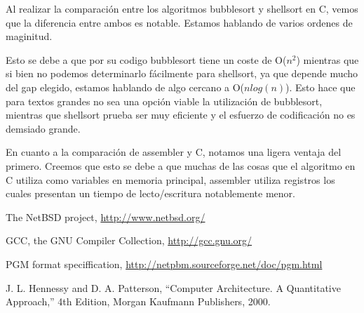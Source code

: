 \documentclass{article}
\begin{document}
	Al realizar la comparación entre los algoritmos bubblesort y shellsort en C, vemos que la diferencia entre ambos es notable. Estamos hablando de varios ordenes de maginitud.
	\par
	Esto se debe a que por su codigo bubblesort tiene un coste de O($n^2$) mientras que si bien no podemos determinarlo fácilmente para shellsort, ya que depende mucho del gap elegido, estamos hablando de algo cercano a O($n log(n)$). Esto hace que para textos grandes no sea una opción viable la utilización de bubblesort, mientras que shellsort prueba ser muy eficiente y el esfuerzo de codificación no es demsiado grande.
	\par
	En cuanto a la comparación de assembler y C, notamos una ligera ventaja del primero. Creemos que esto se debe a que muchas de las cosas que el algoritmo en C utiliza como variables en memoria principal, assembler utiliza registros los cuales presentan un tiempo de lecto/escritura notablemente menor.
\bigskip\bigskip




\begin{thebibliography}{99}

	 The NetBSD project, \url{http://www.netbsd.org/}

	 GCC, the GNU Compiler Collection, \url{http://gcc.gnu.org/}

	 PGM format speciffication, \url{http://netpbm.sourceforge.net/doc/pgm.html}

	 J. L. Hennessy and D. A. Patterson, ``Computer Architecture. A Quantitative
	Approach,'' 4th Edition, Morgan Kaufmann Publishers, 2000.

	\end{thebibliography}

\newpage
\end{document}
